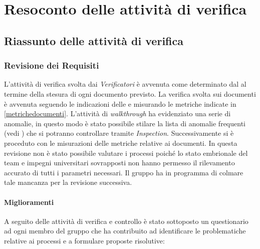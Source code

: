 \section{Resoconto delle attività di verifica}

	\subsection{Riassunto delle attività di verifica}
	\label{RiassuntoAttivitaVerifica}
	
	 	\subsubsection{Revisione dei Requisiti}
	 	L'attività di verifica svolta dai \emph{Verificatori} è avvenuta come determinato dal \PianoDiProgetto{} al termine della stesura di ogni documento previsto. La verifica svolta sui documenti è avvenuta seguendo le indicazioni delle \NormeDiProgetto{} e misurando le metriche indicate in \ref{metrichedocumenti}. L'attività di \emph{walkthrough} ha evidenziato una serie di anomalie, in questo modo è stato possibile stilare la lista di anomalie frequenti (vedi \NormeDiProgetto{}) che si potranno controllare tramite \emph{Inspection}. Successivamente si è proceduto con le misurazioni delle metriche relative ai documenti.
In questa revisione non è stato possibile valutare i processi poiché lo stato embrionale del team e   impegni universitari sovrapposti non hanno permesso il rilevamento accurato di tutti i parametri necessari. Il gruppo ha in programma di colmare tale mancanza per la revisione successiva.

		\paragraph{Miglioramenti}
		A seguito delle attività di verifica e controllo è stato sottoposto un questionario ad ogni membro del gruppo che ha contribuito ad identificare le problematiche relative ai processi e a formulare proposte risolutive: \\
			
